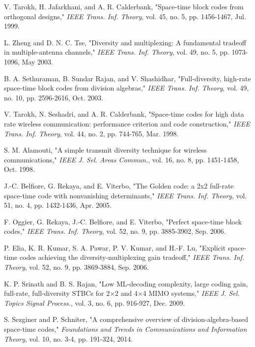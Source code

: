 \documentclass[twocolumn,conference]{IEEEtran}
\begin{document}

\begin{thebibliography}{14}
 V. Tarokh, H. Jafarkhani, and A. R. Calderbank, "Space-time block codes from orthogonal designs," \textit{IEEE Trans. Inf. Theory}, vol. 45, no. 5, pp. 1456-1467, Jul. 1999.

 L. Zheng and D. N. C. Tse, "Diversity and multiplexing: A fundamental tradeoff in multiple-antenna channels," \textit{IEEE Trans. Inf. Theory}, vol. 49, no. 5, pp. 1073-1096, May 2003.

 B. A. Sethuraman, B. Sundar Rajan, and V. Shashidhar, "Full-diversity, high-rate space-time block codes from division algebras," \textit{IEEE Trans. Inf. Theory}, vol. 49, no. 10, pp. 2596-2616, Oct. 2003.

 V. Tarokh, N. Seshadri, and A. R. Calderbank, "Space-time codes for high data rate wireless communication: performance criterion and code construction," \textit{IEEE Trans. Inf. Theory}, vol. 44, no. 2, pp. 744-765, Mar. 1998.

 S. M. Alamouti, "A simple transmit diversity technique for wireless communications," \textit{IEEE J. Sel. Areas Commun.}, vol. 16, no. 8, pp. 1451-1458, Oct. 1998.

 J.-C. Belfiore, G. Rekaya, and E. Viterbo, "The Golden code: a 2x2 full-rate space-time code with nonvanishing determinants," \textit{IEEE Trans. Inf. Theory}, vol. 51, no. 4, pp. 1432-1436, Apr. 2005.

 F. Oggier, G. Rekaya, J.-C. Belfiore, and E. Viterbo, "Perfect space-time block codes," \textit{IEEE Trans. Inf. Theory}, vol. 52, no. 9, pp. 3885-3902, Sep. 2006.

 P. Elia, K. R. Kumar, S. A. Pawar, P. V. Kumar, and H.-F. Lu, "Explicit space-time codes achieving the diversity-multiplexing gain tradeoff," \textit{IEEE Trans. Inf. Theory}, vol. 52, no. 9, pp. 3869-3884, Sep. 2006.

 K. P. Srinath and B. S. Rajan, "Low ML-decoding complexity, large coding gain, full-rate, full-diversity STBCs for 2×2 and 4×4 MIMO systems," \textit{IEEE J. Sel. Topics Signal Process.}, vol. 3, no. 6, pp. 916-927, Dec. 2009.

 S. Sezginer and P. Schniter, "A comprehensive overview of division-algebra-based space-time codes," \textit{Foundations and Trends in Communications and Information Theory}, vol. 10, no. 3-4, pp. 191-324, 2014.


\end{thebibliography}
\end{document}
